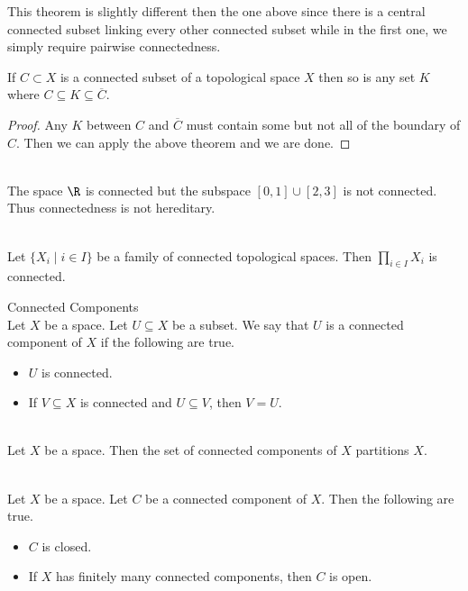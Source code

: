 \documentclass[a4paper]{article}
\begin{document}
This theorem is slightly different then the one above since there is a central connected subset linking every other connected subset while in the first one, we simply require pairwise connectedness. 

\begin{crl}{}{} If $C\subset X$ is a connected subset of a topological space $X$ then so is any set $K$ where $C\subseteq K\subseteq\overline{C}$. 
\begin{proof}
Any $K$ between $C$ and $\overline{C}$ must contain some but not all of the boundary of $C$. Then we can apply the above theorem and we are done. 
\end{proof}
\end{crl}

\begin{eg}{}{}\\
The space $\R$ is connected but the subspace $[0,1]\cup[2,3]$ is not connected. Thus connectedness is not hereditary. 
\end{eg}

\begin{prp}{}{}\\
Let $\{X_i\;|\;i\in I\}$ be a family of connected topological spaces. Then $\prod_{i\in I}X_i$ is connected. 
\end{prp}

\begin{defn}{Connected Components}{}\\
Let $X$ be a space. Let $U\subseteq X$ be a subset. We say that $U$ is a connected component of $X$ if the following are true. 
\begin{itemize}
\item $U$ is connected. 
\item If $V\subseteq X$ is connected and $U\subseteq V$, then $V=U$. 
\end{itemize}
\end{defn}

\begin{prp}{}{}\\
Let $X$ be a space. Then the set of connected components of $X$ partitions $X$. 
\end{prp}

\begin{prp}{}{}\\
Let $X$ be a space. Let $C$ be a connected component of $X$. Then the following are true. 
\begin{itemize}
\item $C$ is closed. 
\item If $X$ has finitely many connected components, then $C$ is open. 
\end{itemize}
\end{prp}
\end{document}
